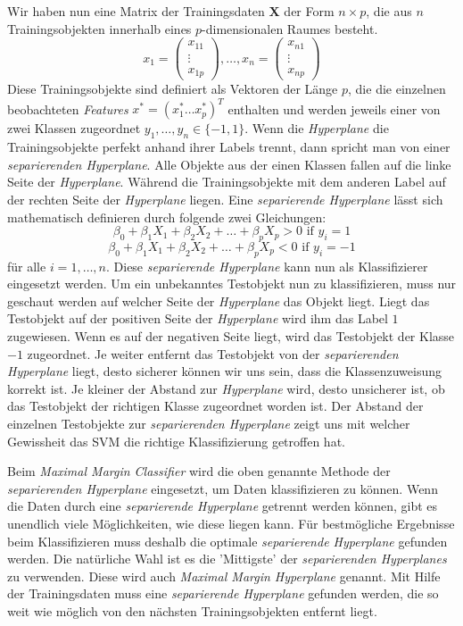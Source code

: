Wir haben nun eine Matrix der Trainingsdaten $\mathbf{X}$ der Form $n \times p$, 
die aus $n$ Trainingsobjekten innerhalb eines $p$-dimensionalen Raumes besteht.
\[x_1 = \left(\begin{array}{c} x_{11} \\ \vdots \\ x_{1p} \end{array}\right) 
  , \dots, 
  x_n = \left(\begin{array}{c} x_{n1} \\ \vdots \\ x_{np} \end{array}\right) \]
Diese Trainingsobjekte sind definiert als Vektoren der Länge $p$, die die einzelnen beobachteten \textit{Features} 
$x^* = (x_1^* \dots x_p^*)^T$ enthalten und werden jeweils einer von zwei Klassen zugeordnet $y_1,\dots,y_n \in \{-1,1\}$.
Wenn die \textit{Hyperplane} die Trainingsobjekte perfekt anhand ihrer Labels trennt,
dann spricht man von einer \textit{separierenden Hyperplane}. 
Alle Objekte aus der einen Klassen fallen auf die linke Seite der \textit{Hyperplane}.
Während die Trainingsobjekte mit dem anderen Label auf der rechten Seite der \textit{Hyperplane} liegen.
Eine \textit{separierende Hyperplane} lässt sich mathematisch definieren durch folgende zwei Gleichungen:
\[\beta_0 + \beta_1X_1 + \beta_2X_2  + \dots + \beta_pX_p> 0 \text{ if } y_i = 1\]
\[\beta_0 + \beta_1X_1 + \beta_2X_2  + \dots + \beta_pX_p< 0 \text{ if } y_i = -1\]
für alle $i = 1 , \dots, n$.
Diese \textit{separierende Hyperplane} kann nun als Klassifizierer eingesetzt werden. 
Um ein unbekanntes Testobjekt nun zu klassifizieren, muss nur geschaut werden auf welcher Seite der \textit{Hyperplane} das Objekt liegt.
Liegt das Testobjekt auf der positiven Seite der \textit{Hyperplane} wird ihm das Label $1$ zugewiesen.
Wenn es auf der negativen Seite liegt, wird das Testobjekt der Klasse $-1$ zugeordnet.
Je weiter entfernt das Testobjekt von der \textit{separierenden Hyperplane} liegt, desto sicherer können wir uns sein,
dass die Klassenzuweisung korrekt ist. Je kleiner der Abstand zur \textit{Hyperplane} wird, desto unsicherer ist,
ob das Testobjekt der richtigen Klasse zugeordnet worden ist. 
Der Abstand der einzelnen Testobjekte zur \textit{separierenden Hyperplane} zeigt uns mit welcher Gewissheit das SVM
die richtige Klassifizierung getroffen hat.\cite[S. 339 - 141]{james_2013}

Beim \textit{Maximal Margin Classifier} wird die oben genannte Methode der \textit{separierenden Hyperplane} eingesetzt,
um Daten klassifizieren zu können. Wenn die Daten durch eine \textit{separierende Hyperplane} getrennt werden können,
gibt es unendlich viele Möglichkeiten, wie diese liegen kann. Für bestmögliche Ergebnisse beim Klassifizieren muss
deshalb die optimale \textit{separierende Hyperplane} gefunden werden. Die natürliche Wahl ist es die 'Mittigste' der
\textit{separierenden Hyperplanes} zu verwenden. Diese wird auch \textit{Maximal Margin Hyperplane} genannt.
Mit Hilfe der Trainingsdaten muss eine \textit{separierende Hyperplane} gefunden werden, die so weit wie möglich von den
nächsten Trainingsobjekten entfernt liegt.\cite[S. 1565f.]{noble_2006}

